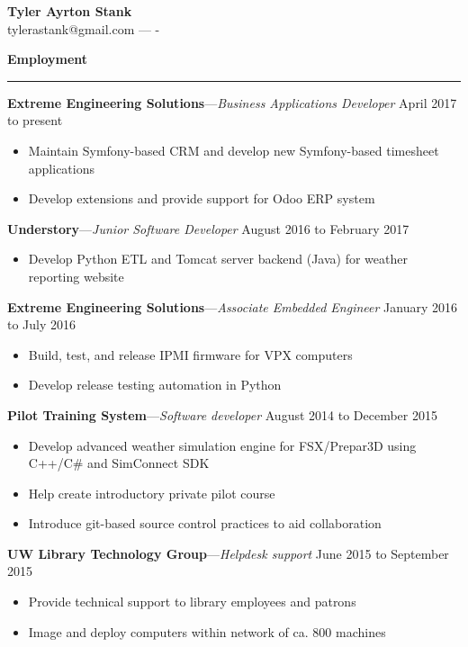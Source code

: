 \documentclass[12pt,letterpaper]{article}
\newenvironment{details}{
    \vspace{-.8em}
    \begin{itemize}
        \renewcommand \labelitemi{\labelitemiv}
        \setlength{\itemsep}{0pt}
        \setlength{\parskip}{-1pt}
        \setlength{\parsep}{0pt}
    }{
    \end{itemize}
    \vspace{-.5em}
}
\newcommand{\hr} {
    \vspace{-1em}
    \par\rule{\textwidth}{1pt}
    \vspace{-1.5em}
}
\newcommand{\ressection}[1] {
    \par{\large \textbf{#1}}
    \hr
}
\newenvironment{employment} {
    \setlength{\parskip}{0pt}
    \ressection{Employment}
}{
    \vspace{0.5em}
}
\newcommand{\employer}[3] {
    \vspace{3pt}
    {\par\textbf{#1}---\textit{#2} \hfill #3}
    \par
}
\begin{document}
\thispagestyle{empty}

\begin{centering}
    {\huge \textbf{Tyler Ayrton Stank}}\\
    tylerastank@gmail.com ---  -\\
\end{centering}


\begin{employment} 

\employer{Extreme Engineering Solutions}{Business Applications Developer}{April 2017 to present}
\begin{details}
    \item Maintain Symfony-based CRM and develop new Symfony-based timesheet applications
    \item Develop extensions and provide support for Odoo ERP system
\end{details}

\employer{Understory}{Junior Software Developer}{August 2016 to February 2017}
\begin{details}
    \item Develop Python ETL and Tomcat server backend (Java) for weather reporting website
\end{details}

\employer{Extreme Engineering Solutions}{Associate Embedded Engineer}{January 2016 to July 2016}
\begin{details}
    \item Build, test, and release IPMI firmware for VPX computers
    \item Develop release testing automation in Python
\end{details}

\employer{Pilot Training System}{Software developer}{August 2014 to December 2015}
\begin{details}
    \item Develop advanced weather simulation engine for FSX/Prepar3D using C++/C\# and SimConnect SDK
    \item Help create introductory private pilot course
    \item Introduce git-based source control practices to aid collaboration
\end{details}

\employer{UW Library Technology Group}{Helpdesk support}{June 2015 to September 2015}
\begin{details}
    \item Provide technical support to library employees and patrons
    \item Image and deploy computers within network of ca. 800 machines
\end{details}


\end{employment}
\end{document}
